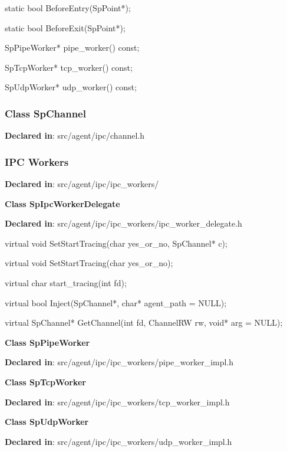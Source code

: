 \begin{apient}
static bool BeforeEntry(SpPoint*);
\end{apient}
\apidesc{
}

\begin{apient}
static bool BeforeExit(SpPoint*);
\end{apient}
\apidesc{
}

\begin{apient}
SpPipeWorker* pipe_worker() const;
\end{apient}
\apidesc{
}

\begin{apient}
SpTcpWorker* tcp_worker() const;
\end{apient}
\apidesc{
}

\begin{apient}
SpUdpWorker* udp_worker() const;
\end{apient}
\apidesc{
}

\subsubsection{Class SpChannel}
\textbf{Declared in}: src/agent/ipc/channel.h

\subsubsection{IPC Workers}
\textbf{Declared in}: src/agent/ipc/ipc\_workers/

\textbf{Class SpIpcWorkerDelegate}

\textbf{Declared in}: src/agent/ipc/ipc\_workers/ipc\_worker\_delegate.h

\begin{apient}
virtual void SetStartTracing(char yes_or_no,
                             SpChannel* c);
\end{apient}
\apidesc{
}

\begin{apient}
virtual void SetStartTracing(char yes_or_no);
\end{apient}
\apidesc{
}

\begin{apient}
virtual char start_tracing(int fd);
\end{apient}
\apidesc{
}

\begin{apient}
virtual bool Inject(SpChannel*, char* agent_path = NULL);
\end{apient}
\apidesc{
}

\begin{apient}
virtual SpChannel* GetChannel(int fd,
                              ChannelRW rw,
                              void* arg = NULL);
\end{apient}
\apidesc{
}

\textbf{Class SpPipeWorker}

\textbf{Declared in}: src/agent/ipc/ipc\_workers/pipe\_worker\_impl.h

\textbf{Class SpTcpWorker}

\textbf{Declared in}: src/agent/ipc/ipc\_workers/tcp\_worker\_impl.h

\textbf{Class SpUdpWorker}

\textbf{Declared in}: src/agent/ipc/ipc\_workers/udp\_worker\_impl.h
